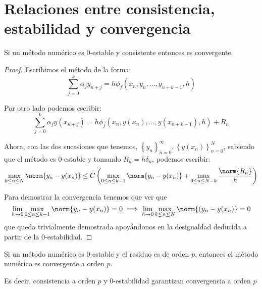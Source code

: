 \section{Relaciones entre consistencia, estabilidad y convergencia}
\begin{theorem}\label{theorem:consist_y_0estable_converge}
Si un método numérico es 0-estable y consistente entonces es convergente.
\end{theorem}
\begin{proof}
Escribimos el método de la forma:
\[\sum_{j=0}^kα_jy_{n+j} = h \phi_f(x_n,y_n,...,y_{n+k-1},h)\]

Por otro lado podemos escribir:
\[\sum_{j=0}^kα_jy(x_{n+j}) = h \phi_f(x_n,y(x_n),...,y(x_{n+k-1}),h) + R_n\]

Ahora, con las dos sucesiones que tenemos, $\left\{y_n\right\}_{n=0}^∞, \left\{y(x_n)\right\}_{n=0}^N$, sabiendo que el método es 0-estable y tomando $R_n=hδ_n$, podemos escribir:
\[\max_{k\leq n \leq N}\norm{y_n-y(x_n)} \leq C\left( \max_{0 \leq n \leq k-1} \norm{y_n-y(x_n)} + \max_{0 \leq n \leq N-k} \frac{\norm{R_n}}{h}\right)\]

Para demostrar la convergencia tenemos que ver que 
\[\lim_{h \to 0} \max_{0 \leq n \leq k-1} \norm{y_n-y(x_n)}= 0 \implies \lim_{h\to 0} \max_{k\leq n \leq N}\norm{(y_n-y(x_n)}=0 \]
que queda trivialmente demostrada apoyándonos en la desigualdad deducida a partir de la 0-estabilidad.
\end{proof}

\begin{theorem}\label{theorem:convergencia_consistencia_orden}
Si un método numérico es 0-estable y el residuo es de orden $p$, entonces el método numérico es convergente a orden $p$.

Es decir, consistencia a orden $p$ y 0-estabilidad garantizan convergencia a orden $p$
\end{theorem}

